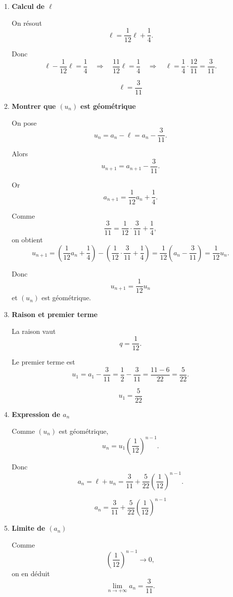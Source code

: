 \documentclass[11pt,a4paper]{article}
\begin{document}
\begin{enumerate}[label=\textbf{2.\arabic*}, resume, leftmargin=1.6em]

\item \textbf{Calcul de \(\ell\)}

On résout
\[
\ell=\frac1{12}\ell+\frac14.
\]

Donc
\[
\ell-\frac1{12}\ell=\frac14
\quad\Longrightarrow\quad
\frac{11}{12}\ell=\frac14
\quad\Longrightarrow\quad
\ell=\frac14\cdot \frac{12}{11}=\frac3{11}.
\]

\[
\boxed{\ell=\frac3{11}}
\]

\item \textbf{Montrer que \((u_n)\) est géométrique}

On pose
\[
u_n=a_n-\ell=a_n-\frac3{11}.
\]

Alors
\[
u_{n+1}=a_{n+1}-\frac3{11}.
\]

Or
\[
a_{n+1}=\frac1{12}a_n+\frac14.
\]

Comme
\[
\frac3{11}=\frac1{12}\cdot \frac3{11}+\frac14,
\]
on obtient
\[
u_{n+1}
=\left(\frac1{12}a_n+\frac14\right)-\left(\frac1{12}\cdot \frac3{11}+\frac14\right)
=\frac1{12}\left(a_n-\frac3{11}\right)
=\frac1{12}u_n.
\]

Donc
\[
\boxed{u_{n+1}=\frac1{12}u_n}
\]
et \((u_n)\) est géométrique.

\item \textbf{Raison et premier terme}

La raison vaut
\[
\boxed{q=\frac1{12}}.
\]

Le premier terme est
\[
u_1=a_1-\frac3{11}=\frac12-\frac3{11}=\frac{11-6}{22}=\frac5{22}.
\]

\[
\boxed{u_1=\frac5{22}}
\]

\item \textbf{Expression de \(a_n\)}

Comme \((u_n)\) est géométrique,
\[
u_n=u_1\left(\frac1{12}\right)^{n-1}.
\]

Donc
\[
a_n=\ell+u_n
=\frac3{11}+\frac5{22}\left(\frac1{12}\right)^{n-1}.
\]

\[
\boxed{
a_n=\frac3{11}+\frac5{22}\left(\frac1{12}\right)^{n-1}
}
\]

\item \textbf{Limite de \((a_n)\)}

Comme
\[
\left(\frac1{12}\right)^{n-1}\to 0,
\]
on en déduit
\[
\boxed{\lim_{n\to+\infty}a_n=\frac3{11}.}
\]

\end{enumerate}
\end{document}

